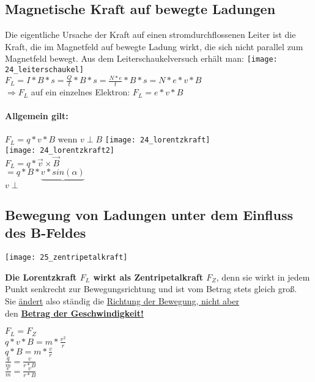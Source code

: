 \subsection{Magnetische Kraft auf bewegte Ladungen}
Die eigentliche Ursache der Kraft auf einen stromdurchflossenen Leiter ist die Kraft, die im Magnetfeld auf bewegte Ladung wirkt, die sich nicht parallel zum Magnetfeld bewegt. Aus dem Leiterschaukelversuch erhält man:
\texttt{[image: 24\_leiterschaukel]}
\vspace{3mm} \\
$F_L = I \ast B \ast s = \frac{Q}{t} \ast B \ast s = \frac{N \ast e}{t} \ast B \ast s = N \ast e \ast v \ast B$
\vspace{3mm} \\
$ \Rightarrow F_L $ auf ein einzelnes Elektron: $ F_L = e \ast v \ast B $

\newpage

\paragraph{Allgemein gilt:} $F_L = q \ast v \ast B $ \hspace{2mm} wenn \hspace{2mm} $ v \perp B $
\texttt{[image: 24\_lorentzkraft]} \\
\texttt{[image: 24\_lorentzkraft2]} \\
$ F_L = q \ast \vec{v} \times \vec{B} $
\vspace{1mm} \\
$= q \ast B \ast \underbrace{v \ast sin(\alpha)} $ \\
\hspace{22.5mm} $ v \perp $

\subsection{Bewegung von Ladungen unter dem Einfluss des B-Feldes}
\texttt{[image: 25\_zentripetalkraft]}

\textbf{Die Lorentzkraft $F_L$ wirkt als Zentripetalkraft $F_Z$}, denn sie wirkt in jedem Punkt senkrecht zur Bewegungsrichtung und ist vom Betrag stets gleich groß. \\
Sie \underline{ändert} also ständig die \underline{Richtung der Bewegung, nicht aber} \\ den \underline{\textbf{Betrag der Geschwindigkeit!}}

\vspace{3mm} 
$ F_L = F_Z$
\vspace{1mm} \\
$ q \ast v \ast B = m \ast \frac{v^2}{r} $
\vspace{1mm} \\
$ q \ast B = m \ast \frac{v}{r} $
\vspace{2mm} \\
$ \frac{q}{m} = \frac{v}{r \ast B} $
\vspace{2mm} \\
$ \frac{e}{m} = \frac{v}{r \ast B} $

